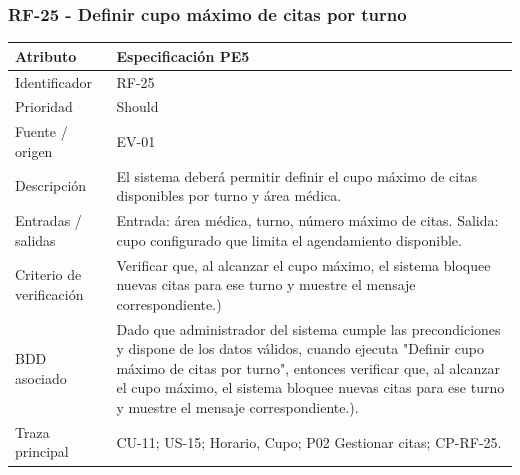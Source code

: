 \documentclass[11pt,a4paper]{article}
\begin{document}
	\subsubsection{RF-25 - Definir cupo máximo de citas por turno}
	\begin{tabularx}{\textwidth}{p{3.2cm}Y}
		\toprule
		\textbf{Atributo} & \textbf{Especificación PE5}\\\midrule
		Identificador & RF-25\\
		Prioridad & Should\\
		Fuente / origen & EV-01\\
		Descripción & El sistema deberá permitir definir el cupo máximo de citas disponibles por turno y área médica.\\
		Entradas / salidas & Entrada: área médica, turno, número máximo de citas. Salida: cupo configurado que limita el agendamiento disponible.\\
		Criterio de verificación & Verificar que, al alcanzar el cupo máximo, el sistema bloquee nuevas citas para ese turno y muestre el mensaje correspondiente.)\\
		BDD asociado & Dado que administrador del sistema cumple las precondiciones y dispone de los datos válidos, cuando ejecuta "Definir cupo máximo de citas por turno", entonces verificar que, al alcanzar el cupo máximo, el sistema bloquee nuevas citas para ese turno y muestre el mensaje correspondiente.).\\
		Traza principal & CU-11; US-15; Horario, Cupo; P02 Gestionar citas; CP-RF-25.\\
		\bottomrule
	\end{tabularx}
\end{document}
